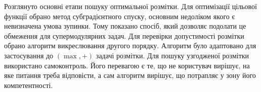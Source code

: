 \chapterConclusion

Розглянуто основні етапи пошуку оптимальної розмітки.
Для оптимізації цільової функції обрано метод субградієнтного спуску, основним недоліком
якого є невизначена умова зупинки. Тому показано спосіб, який дозволяє подолати це обмеження для супермодулярних задач.
Для перевірки допустимості розмітки обрано алгоритм викреслювання другого порядку. Алгоритм було адаптовано
для застосування до $(\max,+)$ задачі розмітки. Для пошуку узгодженої розмітки використано самоконтроль. Його перевагою є те, 
що не користувач вирішує, на яке питання треба відповісти, а сам алгоритм вирішує, що потрапляє у
зону його компетентності.